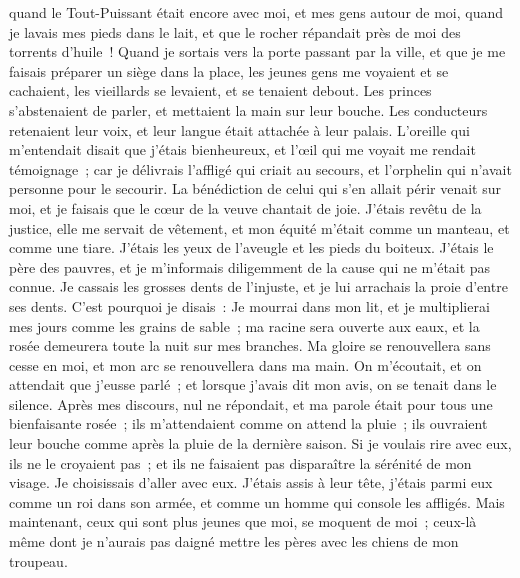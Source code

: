 \begin{multicols}{2}
quand le Tout-Puissant était encore avec moi, et mes gens autour de moi,
quand je lavais mes pieds dans le lait, et que le rocher répandait près de moi des torrents d'huile~!
Quand je sortais vers la porte passant par la ville, et que je me faisais préparer un siège dans la place,
les jeunes gens me voyaient et se cachaient, les vieillards se levaient, et se tenaient debout.
Les princes s'abstenaient de parler, et mettaient la main sur leur bouche.
Les conducteurs retenaient leur voix, et leur langue était attachée à leur palais.
L'oreille qui m'entendait disait que j'étais bienheureux, et l'œil qui me voyait me rendait témoignage~;
car je délivrais l'affligé qui criait au secours, et l'orphelin qui n'avait personne pour le secourir.
La bénédiction de celui qui s'en allait périr venait sur moi, et je faisais que le cœur de la veuve chantait de joie.
J'étais revêtu de la justice, elle me servait de vêtement, et mon équité m'était comme un manteau, et comme une tiare.
J'étais les yeux de l'aveugle et les pieds du boiteux.
J'étais le père des pauvres, et je m'informais diligemment de la cause qui ne m'était pas connue.
Je cassais les grosses dents de l'injuste, et je lui arrachais la proie d'entre ses dents.
C'est pourquoi je disais~: Je mourrai dans mon lit, et je multiplierai mes jours comme les grains de sable~;
ma racine sera ouverte aux eaux, et la rosée demeurera toute la nuit sur mes branches. 
Ma gloire se renouvellera sans cesse en moi, et mon arc se renouvellera dans ma main.
On m'écoutait, et on attendait que j'eusse parlé~; et lorsque j'avais dit mon avis, on se tenait dans le silence.
Après mes discours, nul ne répondait, et ma parole était pour tous une bienfaisante rosée~;
ils m'attendaient comme on attend la pluie~; ils ouvraient leur bouche comme après la pluie de la dernière saison.
Si je voulais rire avec eux, ils ne le croyaient pas~; et ils ne faisaient pas disparaître la sérénité de mon visage.
Je choisissais d'aller avec eux. J'étais assis à leur tête, j'étais parmi eux comme un roi dans son armée, et comme un homme qui console les affligés.
\VerseOne{}Mais maintenant, ceux qui sont plus jeunes que moi, se moquent de moi~; ceux-là même dont je n'aurais pas daigné mettre les pères avec les chiens de mon troupeau.

\end{multicols}
